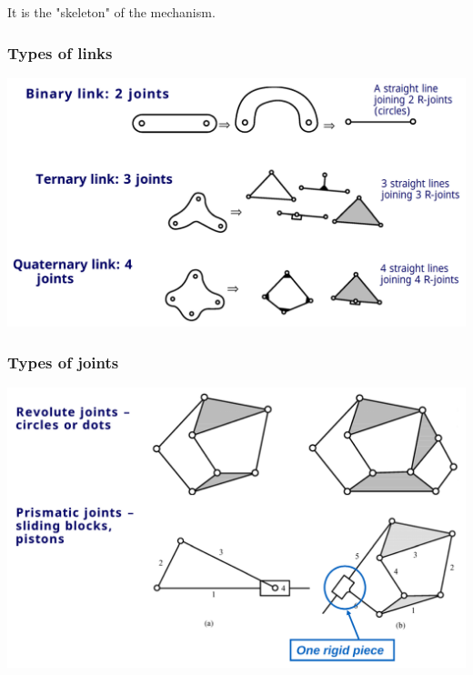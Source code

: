 \documentclass[11pt]{article}
\begin{document}
It is the "skeleton" of the mechanism.
\subsubsection{Types of links}
\label{sec:org8efa73f}
\begin{center}
\includegraphics[width=.9\linewidth]{./images/kinematic-diagram-types-of-links.png}
\end{center}
\subsubsection{Types of joints}
\label{sec:org8ccd04b}
\begin{center}
\includegraphics[width=.9\linewidth]{./images/kinematic-diagram-types-of-joints.png}
\end{center}

 \newpage
\end{document}
